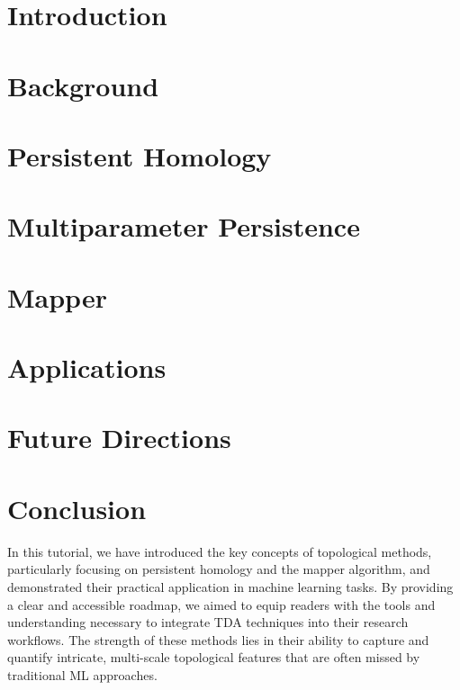 \documentclass[manuscript,screen]{acmart}
\begin{document}
\section{Introduction} \label{sec:intro}


\section{Background} \label{sec:background}


\section{Persistent Homology} \label{sec:PH}


\section{Multiparameter Persistence} \label{sec:MP}


\section{Mapper} \label{sec:mapper}


\section{Applications} \label{sec:applications}


\section{Future Directions} \label{sec:future}




\section{Conclusion} \label{sec:conclusion}
In this tutorial, we have introduced the key concepts of topological methods, particularly focusing on persistent homology and the mapper algorithm, and demonstrated their practical application in machine learning tasks. By providing a clear and accessible roadmap, we aimed to equip readers with the tools and understanding necessary to integrate TDA techniques into their research workflows. The strength of these methods lies in their ability to capture and quantify intricate, multi-scale topological features that are often missed by traditional ML approaches.
\end{document}

